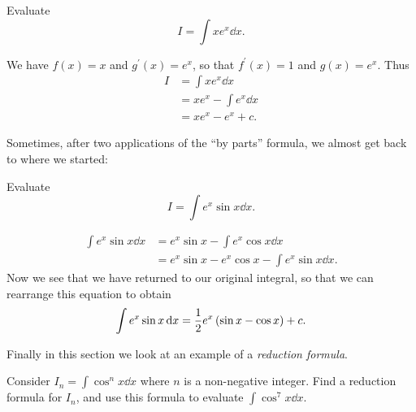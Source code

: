 \begin{exercise}
Evaluate
\[I=\int xe^x\dd{x}.\]
\end{exercise}

\begin{solution}
We have $f(x)=x$ and $g^\prime(x)=e^x$, so that $f^\prime(x)=1$ and $g(x)=e^x$. Thus
\begin{align*}
I&=\int xe^x\dd{x}\\
&=xe^x-\int e^x\dd{x}\\
&=xe^x-e^x+c.
\end{align*}
\end{solution}

Sometimes, after two applications of the ``by parts'' formula, we almost get back to where we started:

\begin{exercise}
Evaluate
\[I=\int e^x\sin x\dd{x}.\]
\end{exercise}

\begin{solution}
\begin{align*}
\int e^x\sin x\dd{x}
&=e^x\sin x-\int e^x\cos x\dd{x}\\
&=e^x\sin x-e^x\cos x-\int e^x\sin x\dd{x}.
\end{align*}
Now we see that we have returned to our original integral, so that we can rearrange this equation to obtain
\[\int e^x\sin x\dd{x}=\frac{1}{2}e^x\left(\sin x-\cos x\right)+c.\]
\end{solution}

Finally in this section we look at an example of a \emph{reduction formula}.

\begin{exercise}
Consider $I_n=\int\cos^n x\dd{x}$ where $n$ is a non-negative integer. Find a reduction formula for $I_n$, and use this formula to evaluate $\int\cos^7x\dd{x}$.
\end{exercise}


